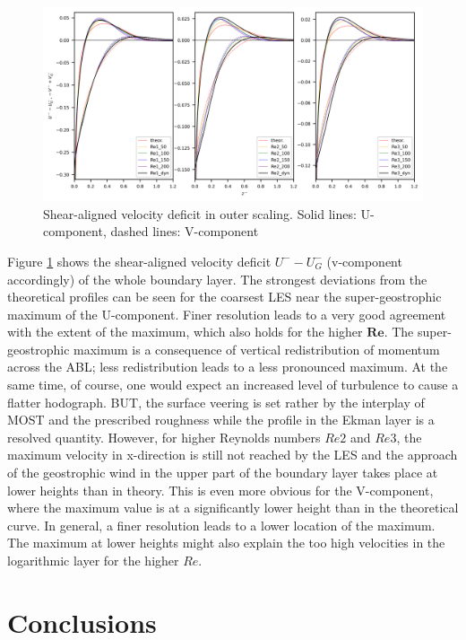 \documentclass[a4paper,11pt]{article}
\newcommand{\RE}{\mathbf{Re}}
\begin{document}
\begin{figure}[ht]
  \centerline{
	\includegraphics[width=\textwidth]{figures_2024/d3y_3Re_Ekman_lin.png}
}
  \caption{Shear-aligned velocity deficit in outer scaling. Solid lines: U-component, dashed lines: V-component}
  \label{3Re_Ekman}
\end{figure}

Figure \ref{3Re_Ekman} shows the shear-aligned velocity deficit $U^--U^-_G$ (v-component accordingly) of the whole boundary layer. The strongest deviations from the theoretical profiles can be seen for the coarsest LES near the super-geostrophic maximum of the U-component. Finer resolution leads to a very good agreement with the extent of the maximum, which also holds for the higher $\RE$. The super-geostrophic maximum is a consequence of vertical redistribution of momentum across the ABL; less redistribution leads to a less pronounced maximum. At the same time, of course, one would expect an increased level of turbulence to cause a flatter hodograph. BUT, the surface veering is set rather by the interplay of MOST and the prescribed roughness while the profile in the Ekman layer is a resolved quantity. However, for higher Reynolds numbers $Re2$ and $Re3$, the maximum velocity in x-direction is still not reached by the LES and the approach of the geostrophic wind in the upper part of the boundary layer takes place at lower heights than in theory. This is even more obvious for the V-component, where the maximum value is at a significantly lower height than in the theoretical curve. In general, a finer resolution leads to a lower location of the maximum. The maximum at lower heights might also explain the too high velocities in the logarithmic layer for the higher $Re$. 


\section{Conclusions}
\label{conclusion}
\end{document}
